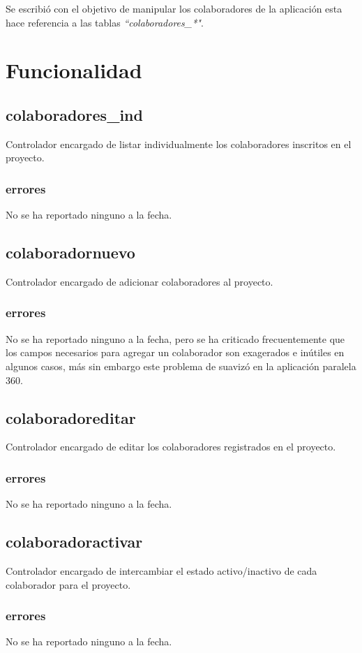 \documentclass[10pt,a4paper]{book}
\begin{document}
	Se escribió con el objetivo de manipular los colaboradores de la aplicación esta hace referencia a las tablas \textit{``colaboradores\_*"}. 
	
	\section{Funcionalidad}
	
	\subsection{colaboradores\_ind}
	Controlador encargado de listar individualmente los colaboradores inscritos en el proyecto.
	\subsubsection{errores}
	No se ha reportado ninguno a la fecha.
	
	
	\subsection{colaboradornuevo}
	Controlador encargado de adicionar colaboradores al proyecto.
	\subsubsection{errores}
	No se ha reportado ninguno a la fecha, pero se ha criticado frecuentemente que los campos necesarios para agregar un colaborador son exagerados e inútiles en algunos casos, más sin embargo este problema de suavizó en la aplicación paralela 360.
	
	\subsection{colaboradoreditar}
	Controlador encargado de editar los colaboradores registrados en el proyecto.
	\subsubsection{errores} 
	No se ha reportado ninguno a la fecha.
	
	\subsection{colaboradoractivar}
	Controlador encargado de intercambiar el estado activo/inactivo de cada colaborador para el proyecto.
	\subsubsection{errores}
	No se ha reportado ninguno a la fecha.
	
\end{document}
